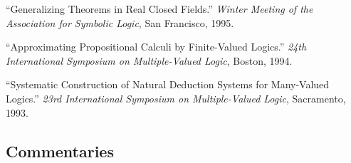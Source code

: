 \documentclass[11pt]{article}
\def\printdate#1{\xprintdate#1-}
\def\xprintdate#1-#2-#3-{#1}
\begin{document}
\ind ``Generalizing Theorems in Real Closed Fields.'' \emph{Winter Meeting of the Association for Symbolic Logic}, San Francisco, \printdate{1995-01-07}.


\ind ``Approximating Propositional Calculi by Finite-Valued Logics.'' \emph{24th International Symposium on Multiple-Valued Logic}, Boston, \printdate{1994-05-26}.



\ind ``Systematic Construction of Natural Deduction Systems for Many-Valued
Logics.'' \emph{23rd International Symposium on Multiple-Valued Logic}, Sacramento, \printdate{1993-05-25}.




















\subsection{Commentaries}
\end{document}
